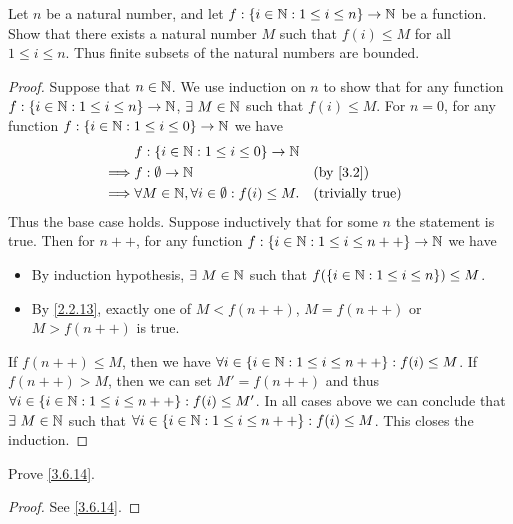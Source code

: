\begin{ex}\label{ex:3.6.3}
  Let \(n\) be a natural number, and let \(f : \{i \in \mathbb{N} : 1 \leq i \leq n\} \to \mathbb{N}\) be a function.
  Show that there exists a natural number \(M\) such that \(f(i) \leq M\) for all \(1 \leq i \leq n\).
  Thus finite subsets of the natural numbers are bounded.
\end{ex}

\begin{proof}
  Suppose that \(n \in \mathbb{N}\).
  We use induction on \(n\) to show that for any function \(f : \{i \in \mathbb{N} : 1 \leq i \leq n\} \to \mathbb{N}\), \(\exists\ M \in \N\) such that \(f(i) \leq M\).
  For \(n = 0\), for any function \(f : \{i \in \mathbb{N} : 1 \leq i \leq 0\} \to \mathbb{N}\) we have
  \begin{align*}
             & f : \{i \in \N : 1 \leq i \leq 0\} \to \N                                             \\
    \implies & f : \emptyset \to \N                                     &  & \text{(by \cref{3.2})}  \\
    \implies & \forall M \in \N, \forall i \in \emptyset : f(i) \leq M. &  & \text{(trivially true)} \\
  \end{align*}
  Thus the base case holds.
  Suppose inductively that for some \(n\) the statement is true.
  Then for \(n++\), for any function \(f : \{i \in \mathbb{N} : 1 \leq i \leq n++\} \to \mathbb{N}\) we have
  \begin{itemize}
    \item By induction hypothesis, \(\exists\ M \in \N\) such that \(f(\{i \in \mathbb{N} : 1 \leq i \leq n\}) \leq M\).
    \item By \cref{2.2.13}, exactly one of \(M < f(n++)\), \(M = f(n++)\) or \(M > f(n++)\) is true.
  \end{itemize}
  If \(f(n++) \leq M\), then we have \(\forall i \in \{i \in \mathbb{N} : 1 \leq i \leq n++\} : f(i) \leq M\).
  If \(f(n++) > M\), then we can set \(M' = f(n++)\) and thus \(\forall i \in \{i \in \mathbb{N} : 1 \leq i \leq n++\} : f(i) \leq M'\).
  In all cases above we can conclude that \(\exists\ M \in \N\) such that \(\forall i \in \{i \in \mathbb{N} : 1 \leq i \leq n++\} : f(i) \leq M\).
  This closes the induction.
\end{proof}

\begin{ex}\label{ex:3.6.4}
  Prove \cref{3.6.14}.
\end{ex}

\begin{proof}
  See \cref{3.6.14}.
\end{proof}

